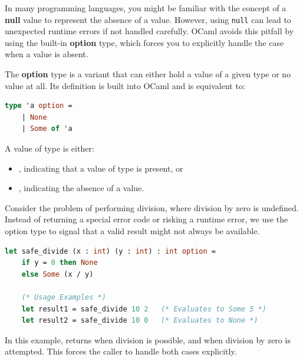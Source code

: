 In many programming languages, you might be familiar with the concept of a \textbf{null} value to represent the absence of a value. However, using \texttt{null} can lead to unexpected runtime errors if not handled carefully. OCaml avoids this pitfall by using the built-in \textbf{option} type, which forces you to explicitly handle the case when a value is absent.

\vspace{2em}

\begin{Def}

The \textbf{option} type is a variant that can either hold a value of a given type or no value at all. Its definition is built into OCaml and is equivalent to:

\begin{lstlisting}[language=OCaml, caption={Definition of the Option Type}, numbers=none]
    type 'a option =
    | None
    | Some of 'a
\end{lstlisting}

A value of type  is either:
\begin{itemize}
    \item {}, indicating that a value  of type  is present, or 
    \item {}, indicating the absence of a value.
\end{itemize}
\end{Def}

\vspace{2em}

\begin{Example}

Consider the problem of performing division, where division by zero is undefined. Instead of returning a special error code or risking a runtime error, we use the option type to signal that a valid result might not always be available.

\begin{lstlisting}[language=OCaml, caption={Safe Division Using Options}, numbers=none]
    let safe_divide (x : int) (y : int) : int option =
    if y = 0 then None
    else Some (x / y)

    (* Usage Examples *)
    let result1 = safe_divide 10 2   (* Evaluates to Some 5 *)
    let result2 = safe_divide 10 0   (* Evaluates to None *)
\end{lstlisting}

In this example,  returns  when division is possible, and  when division by zero is attempted. This forces the caller to handle both cases explicitly.
\end{Example}

